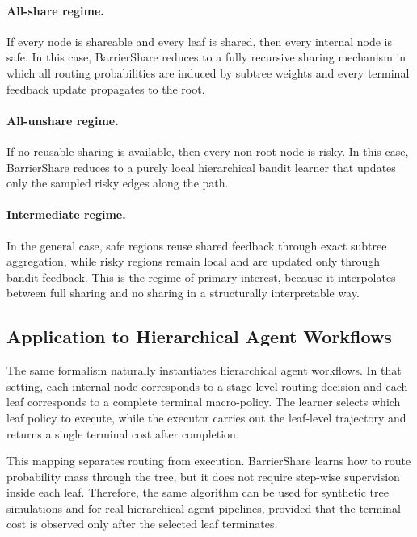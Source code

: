 \documentclass{article}
\begin{document}
\paragraph{All-share regime.}
If every node is shareable and every leaf is shared, then every internal node is safe. In this case, BarrierShare reduces to a fully recursive sharing mechanism in which all routing probabilities are induced by subtree weights and every terminal feedback update propagates to the root.

\paragraph{All-unshare regime.}
If no reusable sharing is available, then every non-root node is risky. In this case, BarrierShare reduces to a purely local hierarchical bandit learner that updates only the sampled risky edges along the path.

\paragraph{Intermediate regime.}
In the general case, safe regions reuse shared feedback through exact subtree aggregation, while risky regions remain local and are updated only through bandit feedback. This is the regime of primary interest, because it interpolates between full sharing and no sharing in a structurally interpretable way.

\subsection{Application to Hierarchical Agent Workflows}
\label{sec:barriershare_agent_instantiation}

The same formalism naturally instantiates hierarchical agent workflows. In that setting, each internal node corresponds to a stage-level routing decision and each leaf corresponds to a complete terminal macro-policy. The learner selects which leaf policy to execute, while the executor carries out the leaf-level trajectory and returns a single terminal cost after completion.

This mapping separates routing from execution. BarrierShare learns how to route probability mass through the tree, but it does not require step-wise supervision inside each leaf. Therefore, the same algorithm can be used for synthetic tree simulations and for real hierarchical agent pipelines, provided that the terminal cost is observed only after the selected leaf terminates.
\end{document}
